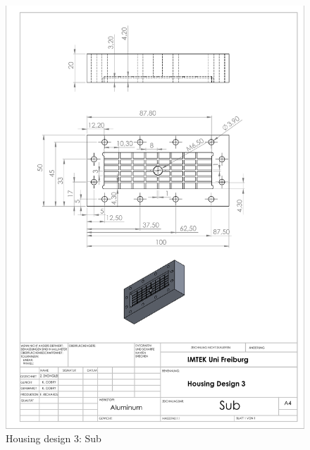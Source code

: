 \begin{figure}[h]%
\centering
\includegraphics[width=1\textwidth]{figures/appendix/housingdesign3sub}%
\caption{Housing design 3: Sub}%
\label{housingdesign3sub}%
\end{figure}





















